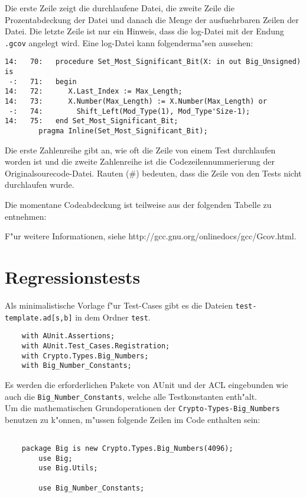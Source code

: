 Die erste Zeile zeigt die durchlaufene Datei, die zweite Zeile die
Prozentabdeckung der Datei und danach die Menge der ausfuehrbaren
Zeilen der Datei. Die letzte Zeile ist nur ein Hinweis, dass die
log-Datei mit der Endung {\tt .gcov} angelegt wird.  Eine log-Datei
kann folgenderma"sen aussehen:
\begin{lstlisting} 
14:   70:   procedure Set_Most_Significant_Bit(X: in out Big_Unsigned) is
 -:   71:   begin
14:   72:      X.Last_Index := Max_Length;
14:   73:      X.Number(Max_Length) := X.Number(Max_Length) or
 -:   74:        Shift_Left(Mod_Type(1), Mod_Type'Size-1);
14:   75:   end Set_Most_Significant_Bit; 
	    pragma Inline(Set_Most_Significant_Bit);
\end{lstlisting}

Die erste Zahlenreihe gibt an, wie oft die Zeile von einem Test
durchlaufen worden ist und die zweite Zahlenreihe ist die
Codezeilennummerierung der Originalsourecode-Datei.  Rauten (\#)
bedeuten, dass die Zeile von den Tests nicht durchlaufen wurde.

Die momentane Codeabdeckung ist teilweise aus der folgenden Tabelle zu
entnehmen:
\begin{figure}[htp]
\centering
\caption{}
\label{}
\end{figure}

F"ur weitere Informationen, siehe http://gcc.gnu.org/onlinedocs/gcc/Gcov.html.
\chapter{Regressionstests}

Als minimalistische Vorlage f"ur Test-Cases gibt es die Dateien {\tt test-template.ad[s,b]} in dem Ordner {\tt test}.

\begin{lstlisting}
	with AUnit.Assertions; 
	with AUnit.Test_Cases.Registration;
	with Crypto.Types.Big_Numbers;
	with Big_Number_Constants;

\end{lstlisting}


Es werden die erforderlichen Pakete von AUnit und der ACL eingebunden wie auch die {\tt Big\_Number\_Constants}, welche alle Testkonstanten enth"alt.\\
Um die mathematischen Grundoperationen der {\tt Crypto-Types-Big\_Numbers} benutzen zu k"onnen, m"ussen folgende Zeilen im Code enthalten sein:

\begin{lstlisting}
	
    package Big is new Crypto.Types.Big_Numbers(4096);
    	use Big;
    	use Big.Utils;

    	use Big_Number_Constants;
    	
\end{lstlisting}

